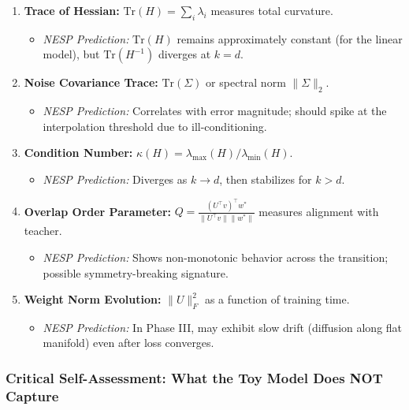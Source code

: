 \documentclass[
  journal=largetwo,
  simfonts=false,
  year=2025,
  volume=37,
]{cup-journal}
\begin{document}
\begin{enumerate}
    \item \textbf{Trace of Hessian:} $\text{Tr}(H) = \sum_i \lambda_i$ measures total curvature.
    \begin{itemize}
        \item \textit{NESP Prediction:} $\text{Tr}(H)$ remains approximately constant (for the linear model), but $\text{Tr}(H^{-1})$ diverges at $k = d$.
    \end{itemize}
    
    \item \textbf{Noise Covariance Trace:} $\text{Tr}(\Sigma)$ or spectral norm $\|\Sigma\|_2$.
    \begin{itemize}
        \item \textit{NESP Prediction:} Correlates with error magnitude; should spike at the interpolation threshold due to ill-conditioning.
    \end{itemize}
    
    \item \textbf{Condition Number:} $\kappa(H) = \lambda_{\max}(H)/\lambda_{\min}(H)$.
    \begin{itemize}
        \item \textit{NESP Prediction:} Diverges as $k \to d$, then stabilizes for $k > d$.
    \end{itemize}
    
    \item \textbf{Overlap Order Parameter:} $Q = \frac{(U^\top v)^\top w^*}{\|U^\top v\| \|w^*\|}$ measures alignment with teacher.
    \begin{itemize}
        \item \textit{NESP Prediction:} Shows non-monotonic behavior across the transition; possible symmetry-breaking signature.
    \end{itemize}
    
    \item \textbf{Weight Norm Evolution:} $\|U\|_F^2$ as a function of training time.
    \begin{itemize}
        \item \textit{NESP Prediction:} In Phase III, may exhibit slow drift (diffusion along flat manifold) even after loss converges.
    \end{itemize}
\end{enumerate}



\subsubsection{Critical Self-Assessment: What the Toy Model Does NOT Capture}
\end{document}
